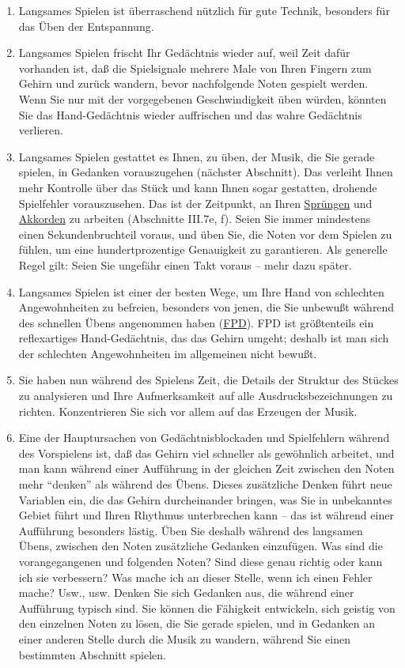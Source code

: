 \begin{enumerate}[label={\arabic*.}] 
\item Langsames Spielen ist überraschend nützlich für gute Technik, besonders für das Üben der Entspannung.
\item Langsames Spielen frischt Ihr Gedächtnis wieder auf, weil Zeit dafür vorhanden ist, daß die Spielsignale mehrere Male von Ihren Fingern zum Gehirn und zurück wandern, bevor nachfolgende Noten gespielt werden.
Wenn Sie nur mit der vorgegebenen Geschwindigkeit üben würden, könnten Sie das Hand-Gedächtnis wieder auffrischen und das wahre Gedächtnis verlieren.
\item Langsames Spielen gestattet es Ihnen, zu üben, der Musik, die Sie gerade spielen, in Gedanken vorauszugehen (nächster Abschnitt).
Das verleiht Ihnen mehr Kontrolle über das Stück und kann Ihnen sogar gestatten, drohende Spielfehler vorauszusehen.
Das ist der Zeitpunkt, an Ihren \hyperref[c1iii7f]{Sprüngen} und \hyperref[c1iii7e]{Akkorden} zu arbeiten (Abschnitte III.7e, f).
Seien Sie immer mindestens einen Sekundenbruchteil voraus, und üben Sie, die Noten vor dem Spielen zu fühlen, um eine hundertprozentige Genauigkeit zu garantieren.
Als generelle Regel gilt: Seien Sie ungefähr einen Takt voraus -- mehr dazu später.
\item Langsames Spielen ist einer der besten Wege, um Ihre Hand von schlechten Angewohnheiten zu befreien, besonders von jenen, die Sie unbewußt während des schnellen Übens angenommen haben (\hyperref[fpd]{FPD}).
FPD ist größtenteils ein reflexartiges Hand-Gedächtnis, das das Gehirn umgeht; deshalb ist man sich der schlechten Angewohnheiten im allgemeinen nicht bewußt.
\item Sie haben nun während des Spielens Zeit, die Details der Struktur des Stückes zu analysieren und Ihre Aufmerksamkeit auf alle Ausdrucksbezeichnungen zu richten.
Konzentrieren Sie sich vor allem auf das Erzeugen der Musik.
\item Eine der Hauptursachen von Gedächtnisblockaden und Spielfehlern während des Vorspielens ist, daß das Gehirn viel schneller als gewöhnlich arbeitet, und man kann während einer Aufführung in der gleichen Zeit zwischen den Noten mehr \enquote{denken} als während des Übens.
Dieses zusätzliche Denken führt neue Variablen ein, die das Gehirn durcheinander bringen, was Sie in unbekanntes Gebiet führt und Ihren Rhythmus unterbrechen kann -- das ist während einer Aufführung besonders lästig.
Üben Sie deshalb während des langsamen Übens, zwischen den Noten zusätzliche Gedanken einzufügen.
Was sind die vorangegangenen und folgenden Noten?
Sind diese genau richtig oder kann ich sie verbessern?
Was mache ich an dieser Stelle, wenn ich einen Fehler mache?
Usw., usw.
Denken Sie sich Gedanken aus, die während einer Aufführung typisch sind.
Sie können die Fähigkeit entwickeln, sich geistig von den einzelnen Noten zu lösen, die Sie gerade spielen, und in Gedanken an einer anderen Stelle durch die Musik zu wandern, während Sie einen bestimmten Abschnitt spielen.
\end{enumerate}

